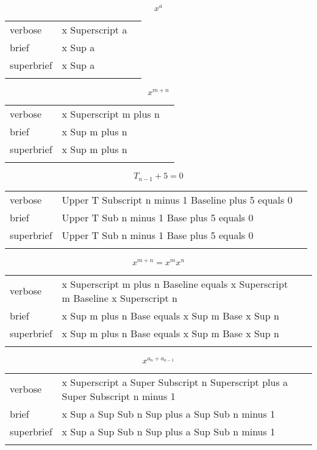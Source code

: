 \E \[x^a\]
\begin{longtable}[c]{@{}lll@{}}
\toprule\addlinespace
verbose & x Superscript a &

\\\addlinespace
brief & x Sup a &

\\\addlinespace
superbrief & x Sup a &

\\\addlinespace
\bottomrule
\end{longtable}


\R
\E \[x^{m+n}\]
\begin{longtable}[c]{@{}lll@{}}
\toprule\addlinespace
verbose & x Superscript m plus n &

\\\addlinespace
brief & x Sup m plus n &

\\\addlinespace
superbrief & x Sup m plus n &

\\\addlinespace
\bottomrule
\end{longtable}


\E \[T_{n-1}+5=0\]
\begin{longtable}[c]{@{}lll@{}}
\toprule\addlinespace
verbose & Upper T Subscript n minus 1 Baseline plus 5 equals 0 &

\\\addlinespace
brief & Upper T Sub n minus 1 Base plus 5 equals 0 &

\\\addlinespace
superbrief & Upper T Sub n minus 1 Base plus 5 equals 0 &

\\\addlinespace
\bottomrule
\end{longtable}


\E \[x^{m+n}=x^mx^n\]
\begin{longtable}[c]{@{}lll@{}}
\toprule\addlinespace
verbose & x Superscript m plus n Baseline equals x Superscript m
Baseline x Superscript n &

\\\addlinespace
brief & x Sup m plus n Base equals x Sup m Base x Sup n &

\\\addlinespace
superbrief & x Sup m plus n Base equals x Sup m Base x Sup n &

\\\addlinespace
\bottomrule
\end{longtable}


\R
\E \[x^{a_n+a_{n-1}}\]
\begin{longtable}[c]{@{}lll@{}}
\toprule\addlinespace
verbose & x Superscript a Super Subscript n Superscript plus a Super
Subscript n minus 1 &

\\\addlinespace
brief & x Sup a Sup Sub n Sup plus a Sup Sub n minus 1 &

\\\addlinespace
superbrief & x Sup a Sup Sub n Sup plus a Sup Sub n minus 1 &

\\\addlinespace
\bottomrule
\end{longtable}


